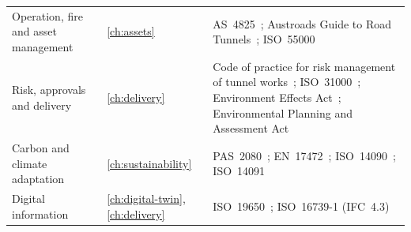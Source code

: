 \begin{table}[htbp]
\begin{tabularx}{\textwidth}{>{\raggedright\arraybackslash}p{} >{\raggedright\arraybackslash}p{} >{\raggedright\arraybackslash}X}
Operation, fire and asset management & \ref{ch:assets} & AS~4825~\citep{as4825}; Austroads Guide to Road Tunnels~\citep{austroads2024agrt}; ISO~55000~\citep{iso55000} \\
Risk, approvals and delivery & \ref{ch:delivery} & Code of practice for risk management of tunnel works~\citep{itaimia2023risk}; ISO~31000~\citep{iso31000}; Environment Effects Act~\citep{vic1978eeact}; Environmental Planning and Assessment Act~\citep{nsw1979epa} \\
Carbon and climate adaptation & \ref{ch:sustainability} & PAS~2080~\citep{pas2080}; EN~17472~\citep{en17472}; ISO~14090~\citep{iso14090}; ISO~14091~\citep{iso14091} \\
Digital information & \ref{ch:digital-twin}, \ref{ch:delivery} & ISO~19650~\citep{iso19650}; ISO~16739-1 (IFC~4.3)~\citep{iso16739} \\
\bottomrule
\end{tabularx}
\end{table}

\clearpage
\chapterreferences
